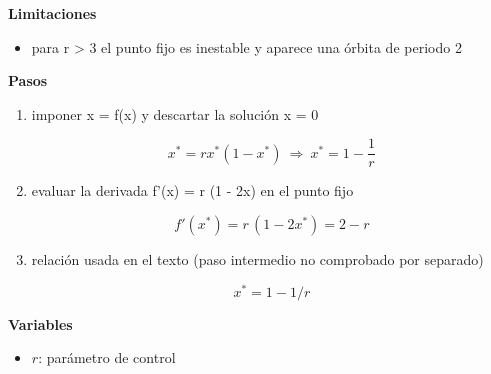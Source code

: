 \documentclass[10pt,openany]{book}
\begin{document}
\begin{tcolorbox}[title={Desarrollos del modelo}, studiumdef, breakable]
\noindent\textbf{Limitaciones}
\begin{itemize}
\item para r > 3 el punto fijo es inestable y aparece una órbita de periodo 2
\end{itemize}

\noindent\textbf{Pasos}
\begin{enumerate}
\item
imponer x = f(x) y descartar la solución x = 0

\[
x^{*} = r x^{*}(1 - x^{*})\ \Rightarrow\ x^{*} = 1 - \frac{1}{r}
\]
\item
evaluar la derivada f'(x) = r (1 - 2x) en el punto fijo

\[
f'(x^{*}) = r\,(1 - 2x^{*}) = 2 - r
\]
\item
relación usada en el texto (paso intermedio no comprobado por separado)

\[
x^{*} = 1 - 1/r
\]
\end{enumerate}

\noindent\textbf{Variables}
\begin{itemize}
\item $r$: parámetro de control
\end{itemize}


\end{tcolorbox}
\end{document}
